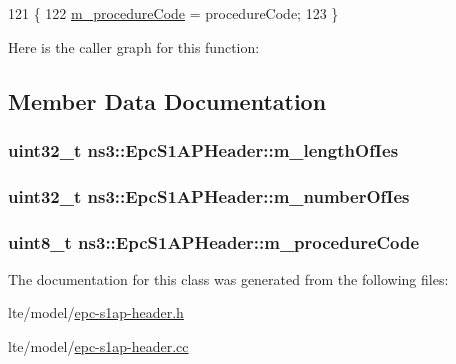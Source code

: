 \begin{DoxyCode}
121 \{
122   \hyperlink{classns3_1_1EpcS1APHeader_a71ed80b942f3c50799df36a381283119}{m\_procedureCode} = procedureCode;
123 \}
\end{DoxyCode}


Here is the caller graph for this function\+:




\subsection{Member Data Documentation}
\subsubsection[{\texorpdfstring{m\+\_\+length\+Of\+Ies}{m_lengthOfIes}}]{\setlength{\rightskip}{0pt plus 5cm}uint32\+\_\+t ns3\+::\+Epc\+S1\+A\+P\+Header\+::m\+\_\+length\+Of\+Ies\hspace{0.3cm}{\ttfamily [private]}}\hypertarget{classns3_1_1EpcS1APHeader_a3b369a4e61c49909d697541d406f3993}{}\label{classns3_1_1EpcS1APHeader_a3b369a4e61c49909d697541d406f3993}
\subsubsection[{\texorpdfstring{m\+\_\+number\+Of\+Ies}{m_numberOfIes}}]{\setlength{\rightskip}{0pt plus 5cm}uint32\+\_\+t ns3\+::\+Epc\+S1\+A\+P\+Header\+::m\+\_\+number\+Of\+Ies\hspace{0.3cm}{\ttfamily [private]}}\hypertarget{classns3_1_1EpcS1APHeader_a419b5e6b7cde1e10ae6fb37f21f346cc}{}\label{classns3_1_1EpcS1APHeader_a419b5e6b7cde1e10ae6fb37f21f346cc}
\subsubsection[{\texorpdfstring{m\+\_\+procedure\+Code}{m_procedureCode}}]{\setlength{\rightskip}{0pt plus 5cm}uint8\+\_\+t ns3\+::\+Epc\+S1\+A\+P\+Header\+::m\+\_\+procedure\+Code\hspace{0.3cm}{\ttfamily [private]}}\hypertarget{classns3_1_1EpcS1APHeader_a71ed80b942f3c50799df36a381283119}{}\label{classns3_1_1EpcS1APHeader_a71ed80b942f3c50799df36a381283119}


The documentation for this class was generated from the following files\+:\begin{DoxyCompactItemize}
\item 
lte/model/\hyperlink{epc-s1ap-header_8h}{epc-\/s1ap-\/header.\+h}\item 
lte/model/\hyperlink{epc-s1ap-header_8cc}{epc-\/s1ap-\/header.\+cc}\end{DoxyCompactItemize}
